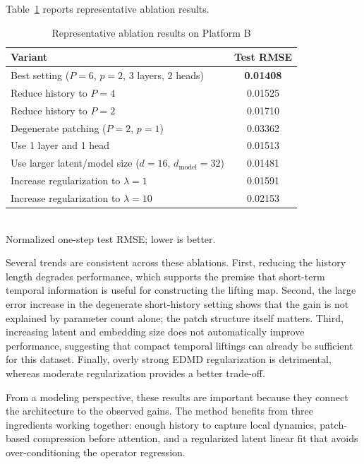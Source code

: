 \documentclass[journal]{IEEEtran}
\begin{document}
Table~\ref{tab:ablation_platform_b} reports representative ablation results.

\begin{table}[!t]
\renewcommand{\arraystretch}{1.2}
\caption{Representative ablation results on Platform B}
\label{tab:ablation_platform_b}
\centering
\begin{tabular}{>{\raggedright\arraybackslash}p{}c}
\hline\hline
Variant & Test RMSE \\
\hline
Best setting ($P=6$, $p=2$, 3 layers, 2 heads) & \textbf{0.01408} \\
Reduce history to $P=4$ & 0.01525 \\
Reduce history to $P=2$ & 0.01710 \\
Degenerate patching ($P=2$, $p=1$) & 0.03362 \\
Use 1 layer and 1 head & 0.01513 \\
Use larger latent/model size ($d=16$, $d_{\mathrm{model}}=32$) & 0.01481 \\
Increase regularization to $\lambda=1$ & 0.01591 \\
Increase regularization to $\lambda=10$ & 0.02153 \\
\hline\hline
\end{tabular}
\\[2pt]
{\footnotesize Normalized one-step test RMSE; lower is better.}
\end{table}

Several trends are consistent across these ablations. First, reducing the history length degrades performance, which supports the premise that short-term temporal information is useful for constructing the lifting map. Second, the large error increase in the degenerate short-history setting shows that the gain is not explained by parameter count alone; the patch structure itself matters. Third, increasing latent and embedding size does not automatically improve performance, suggesting that compact temporal liftings can already be sufficient for this dataset. Finally, overly strong EDMD regularization is detrimental, whereas moderate regularization provides a better trade-off.

From a modeling perspective, these results are important because they connect the architecture to the observed gains. The method benefits from three ingredients working together: enough history to capture local dynamics, patch-based compression before attention, and a regularized latent linear fit that avoids over-conditioning the operator regression.
\end{document}
